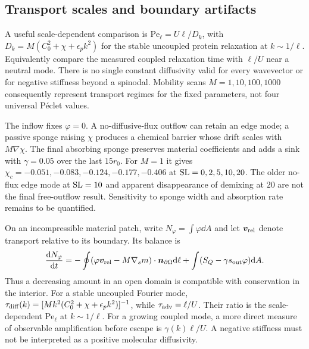 \subsection{Transport scales and boundary artifacts}


A useful scale-dependent comparison is $\mathrm{Pe}_\ell=U\ell/D_k$, with $D_k=M(C_0^2+\chi+\epsilon_pk^2)$ for the stable uncoupled protein relaxation at $k\sim1/\ell$. Equivalently compare the measured coupled relaxation time with $\ell/U$ near a neutral mode. There is no single constant diffusivity valid for every wavevector or for negative stiffness beyond a spinodal. Mobility scans $M=1,10,100,1000$ consequently represent transport regimes for the fixed parameters, not four universal P\'eclet values.

The inflow fixes $\varphi=0$. A no-diffusive-flux outflow can retain an edge mode; a passive sponge raising $\chi$ produces a chemical barrier whose drift scales with $M\nabla\chi$. The final absorbing sponge preserves material coefficients and adds a sink with $\gamma=0.05$ over the last $15r_0$. For $M=1$ it gives $\chi_c=-0.051,-0.083,-0.124,-0.177,-0.406$ at $\mathrm{SL}=0,2,5,10,20$. The older no-flux edge mode at $\mathrm{SL}=10$ and apparent disappearance of demixing at $20$ are not the final free-outflow result. Sensitivity to sponge width and absorption rate remains to be quantified.




On an incompressible material patch, write $N_\varphi=\int\varphi\dd A$ and let $\bm v_{\rm rel}$ denote transport relative to its boundary. Its balance is
\begin{equation}
\frac{\mathrm{d} N_\varphi}{\mathrm{d} t}
=-\oint(\varphi\bm v_{\rm rel}-M\nabla_s m)\cdot\bm n_{\partial\Omega}\mathrm{d}\ell
+\int(S_Q-\gamma s_{\rm out}\varphi)\mathrm{d} A.
\label{eq:composition-budget}
\end{equation}
Thus a decreasing amount in an open domain is compatible with conservation in the interior. For a stable uncoupled Fourier mode, $\tau_{\rm diff}(k)=[Mk^2(C_0^2+\chi+\epsilon_pk^2)]^{-1}$, while $\tau_{\rm adv}=\ell/U$. Their ratio is the scale-dependent $\mathrm{Pe}_\ell$ at $k\sim1/\ell$. For a growing coupled mode, a more direct measure of observable amplification before escape is $\gamma(k)\ell/U$. A negative stiffness must not be interpreted as a positive molecular diffusivity.

